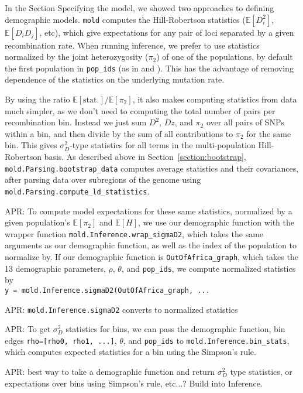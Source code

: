 \documentclass[10pt]{article}
\makeatletter
\newcommand{\comment}[1]{{\color{blue}APR: #1}}
\newcommand{\mold}{\texttt{mold}\xspace}
\newcommand{\py}[1]{\lstinline[breaklines=true,language=Python, showstringspaces=False]@#1@}
\newcommand{\E}{\mathbb{E}}
\makeatother
\begin{document}
In the Section Specifying the model, we showed two approaches to defining demographic models.
\mold computes the Hill-Robertson statistics ($\E[D_i^2]$, $\E[D_i D_j]$, etc), which give expectations for any pair of loci separated by a given recombination rate.
When running inference, we prefer to use statistics normalized by the joint heterozygosity ($\pi_2$) of one of the populations, by default the first population in \py{pop_ids} (as in \citet{Rogers2014} and \citet{Ragsdale2018}).
This has the advantage of removing dependence of the statistics on the underlying mutation rate.

By using the ratio $\E[\text{stat.}]/\E[\pi_2]$, it also makes computing statistics from data much simpler, as we don't need to computing the total number of pairs per recombination bin.
Instead we just sum $D^2$, $Dz$, and $\pi_2$ over all pairs of SNPs within a bin, and then divide by the sum of all contributions to $\pi_2$ for the same bin.
This gives $\sigma_D^2$-type statistics for all terms in the multi-population Hill-Robertson basis.
As described above in Section~\ref{section:bootstrap}, \py{mold.Parsing.bootstrap_data} computes average statistics and their covariances, after parsing data over subregions of the genome using \py{mold.Parsing.compute_ld_statistics}.

\comment{
To compute model expectations for these same statistics, normalized by a given population's $\E[\pi_2]$ and $\E[H]$, we use our demographic function with the wrapper function \py{mold.Inference.wrap_sigmaD2}, which takes the same arguments as our demographic function, as well as the index of the population to normalize by.
If our demographic function is \py{OutOfAfrica_graph}, which takes the 13 demographic parameters, $\rho$, $\theta$, and \py{pop_ids}, we compute normalized statistics by \\
\py{y = mold.Inference.sigmaD2(OutOfAfrica_graph, ...}
}

\comment{\py{mold.Inference.sigmaD2} converts to normalized statistics}

\comment{To get $\sigma_D^2$ statistics for bins, we can pass the demographic function, bin edges \py{rho=[rho0, rho1, ...]}, $\theta$, and \py{pop_ids} to \py{mold.Inference.bin_stats}, which computes expected statistics for a bin using the Simpson's rule.}

\comment{best way to take a demographic function and return $\sigma_D^2$ type statistics, or expectations over bins using Simpson's rule, etc...? Build into Inference.}
\end{document}
